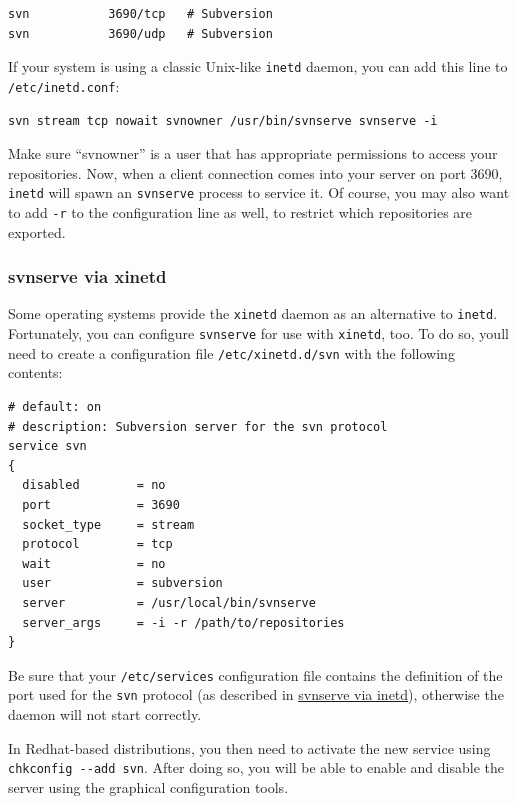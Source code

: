 \begin{verbatim}
svn           3690/tcp   # Subversion
svn           3690/udp   # Subversion
\end{verbatim}

If your system is using a classic Unix-like \texttt{inetd} daemon, you
can add this line to \texttt{/etc/inetd.conf}:

\begin{verbatim}
svn stream tcp nowait svnowner /usr/bin/svnserve svnserve -i
\end{verbatim}

Make sure ``svnowner'' is a user that has appropriate permissions to
access your repositories. Now, when a client connection comes into your
server on port 3690, \texttt{inetd} will spawn an \texttt{svnserve}
process to service it. Of course, you may also want to add \texttt{-r}
to the configuration line as well, to restrict which repositories are
exported.

\subsubsection{svnserve via
xinetd}\label{svn.serverconfig.svnserve.invoking.xinetd}

Some operating systems provide the \texttt{xinetd} daemon as an
alternative to \texttt{inetd}. Fortunately, you can configure
\texttt{svnserve} for use with \texttt{xinetd}, too. To do so,
you\textquotesingle ll need to create a configuration file
\texttt{/etc/xinetd.d/svn} with the following contents:

\begin{verbatim}
# default: on
# description: Subversion server for the svn protocol
service svn
{
  disabled        = no
  port            = 3690
  socket_type     = stream
  protocol        = tcp
  wait            = no
  user            = subversion
  server          = /usr/local/bin/svnserve
  server_args     = -i -r /path/to/repositories
}
\end{verbatim}

Be sure that your \texttt{/etc/services} configuration file contains the
definition of the port used for the \texttt{svn} protocol (as described
in \hyperref[svn.serverconfig.svnserve.invoking.inetd]{svnserve via
inetd}), otherwise the daemon will not start correctly.

In Redhat-based distributions, you then need to activate the new service
using \texttt{chkconfig\ -\/-add\ svn}. After doing so, you will be able
to enable and disable the server using the graphical configuration
tools.

